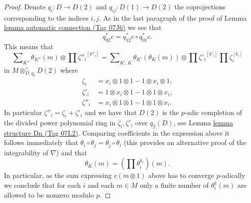 \documentclass{amsart}
\theoremstyle{plain}
\theoremstyle{definition}
\theoremstyle{remark}
\numberwithin{equation}{subsection}
\begin{document}
\begin{proof}
\medskip\noindent
Denote $q_i : D \to D(2)$ and $q_{ij} : D(1) \to D(2)$ the coprojections
corresponding to the indices $i, j$. As in the last paragraph of the proof of
Lemma \href{https://stacks.math.columbia.edu/tag/07J6}{lemma automatic connection (Tag 07J6)}
we see that
$$
q_{02}^*c = q_{12}^*c \circ q_{01}^*c.
$$
This means that
$$
\sum\nolimits_{K''} \theta_{K''}(m) \otimes \prod {\zeta''_i}^{[k''_i]}
=
\sum\nolimits_{K', K} \theta_{K'}(\theta_K(m))
\otimes \prod {\zeta'_i}^{[k'_i]} \prod \zeta_i^{[k_i]}
$$
in $M \otimes^\wedge_{D, q_2} D(2)$ where
\begin{align*}
\zeta_i & = x_i \otimes 1 \otimes 1 - 1 \otimes x_i \otimes 1,\\
\zeta'_i & = 1 \otimes x_i \otimes 1 - 1 \otimes 1 \otimes x_i,\\
\zeta''_i & = x_i \otimes 1 \otimes 1 - 1 \otimes 1 \otimes x_i.
\end{align*}
In particular $\zeta''_i = \zeta_i + \zeta'_i$ and we have that
$D(2)$ is the $p$-adic completion of the divided power polynomial
ring in $\zeta_i, \zeta'_i$ over $q_2(D)$, see Lemma \href{https://stacks.math.columbia.edu/tag/07L2}{lemma structure Dn (Tag 07L2)}.
Comparing coefficients in the expression above it follows immediately that
$\theta_i \circ \theta_j = \theta_j \circ \theta_i$
(this provides an alternative proof of the integrability of $\nabla$) and that
$$
\theta_K(m) = (\prod \theta_i^{k_i})(m).
$$
In particular, as the sum expressing $c(m \otimes 1)$ above has to converge
$p$-adically we conclude that for each $i$ and each $m \in M$ only a finite
number of $\theta_i^k(m)$ are allowed to be nonzero modulo $p$.
\end{proof}
\end{document}
